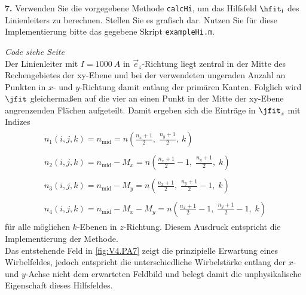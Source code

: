 \documentclass[./Protokollheft.tex]{subfiles}
\begin{document}
 \label{v4.PA.7}
\begin{framed}
	\noindent \textbf{7.} Verwenden Sie die vorgegebene Methode \lstinline{calcHi}, um das Hilfsfeld $\hfit_{\text{i}}$ des Linienleiters zu berechnen.
Stellen Sie es grafisch dar. Nutzen Sie für diese Implementierung bitte das gegebene Skript \lstinline{exampleHi.m}.\label{exer:visualizeHi}
\end{framed}

\textit{ Code siehe Seite \pageref{code4.7} } \\
Der Linienleiter mit $I = \SI{1000}{A}$ in $\vec{e}_z$-Richtung liegt zentral in der Mitte des Rechengebietes der xy-Ebene und bei der verwendeten ungeraden Anzahl an Punkten in $x$- und $y$-Richtung damit entlang der primären Kanten.
Folglich wird $\jfit$ gleichermaßen auf die vier an einen Punkt in der Mitte der xy-Ebene angrenzenden Flächen aufgeteilt. Damit ergeben sich die Einträge in $\jfit_z$ mit Indizes
\begin{align}
	\begin{split}
		n_1 \left( i,j,k \right) = n_{\mathrm{mid}}
			= n \left( \frac{n_x +1}{2} , \; \frac{n_y +1}{2} , \: k \right)
	\end{split}
	\\
	\begin{split}
		n_2 \left( i,j,k \right) = n_{\mathrm{mid}} - M_x
			= n \left( \frac{n_x +1}{2}-1 , \; \frac{n_y +1}{2} , \; k \right)
	\end{split}
	\\
	\begin{split}
		n_3 \left( i,j,k \right) = n_{\mathrm{mid}} - M_y
			= n \left( \frac{n_x +1}{2} , \; \frac{n_y +1}{2} -1 , \; k \right)
	\end{split}
	\\
	\begin{split}
		n_4 \left( i,j,k \right) = n_{\mathrm{mid}} - M_x - M_y
			= n \left( \frac{n_x +1}{2}-1 , \; \frac{n_y +1}{2}-1 , \; k \right)
	\end{split}
\end{align}
für alle möglichen $k$-Ebenen in $z$-Richtung.
Diesem Ausdruck entspricht die Implementierung der Methode.
\\
Das entstehende Feld in \ref{fig:V4.PA7} zeigt die prinzipielle Erwartung eines Wirbelfeldes, jedoch entspricht die unterschiedliche Wirbelstärke entlang der $x$- und $y$-Achse nicht dem erwarteten Feldbild und belegt damit die unphysikalische Eigenschaft dieses Hilfsfeldes.
\end{document}
